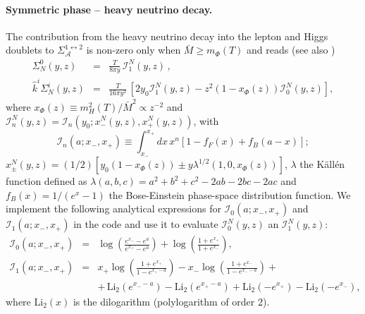 \documentclass[12pt, a4paper]{article}
\def\Mav{\bar{M}}
\begin{document}
\paragraph{Symmetric phase -- heavy neutrino decay.} The contribution from the heavy neutrino decay into the lepton and Higgs doublets to $\Sigma_\mathcal{A}^{1\leftrightarrow 2}$ is non-zero only when $\Mav \geq m_\Phi(T)$ and reads \cite{Frossard:2012pc} (see also \cite{Klaric:2021cpi})
\begin{eqnarray}
 \Sigma_N^0(y, z) &=& \frac{T}{8\pi y}\,\mathcal{I}^N_1(y, z)\,,\\
 \hat{k}^i\Sigma_N^i(y, z) &=& \frac{T}{16\pi y^2}\,\left[2y_0 \mathcal{I}^N_1(y, z) - z^2 \left(1 -x_\Phi(z)\right) \mathcal{I}^N_0(y, z)\right],
\end{eqnarray}
where $x_\Phi(z) \equiv m_H^2(T)/\Mav^2\propto z^{-2}$ and $\mathcal{I}^N_n(y, z) = \mathcal{I}_n(y_0; x^N_-(y, z), x^N_+(y,z))$, with
\begin{equation}
 \mathcal{I}_n(a; x_-, x_+) \equiv \int_{x_{-}}^{x_+} dx\, x^n [1-f_F(x)+f_B(a-x)];
\end{equation}
$x^N_{\pm}(y,z) = (1/2)[y_0(1-x_\Phi(z)) \pm y \lambda^{1/2}(1, 0, x_\Phi(z))]$, $\lambda$ the Källén function defined as $\lambda(a, b, c) = a^2 + b^2 + c^2 - 2ab - 2bc - 2ac$ and $f_B(x) = 1/(e^{x}-1)$ the Bose-Einstein phase-space distribution function.
We implement the following analytical expressions for $\mathcal{I}_0(a; x_-,x_+)$ and $\mathcal{I}_1(a; x_-,x_+)$ in the code and use it to evaluate $\mathcal{I}^N_0(y,z)$ an $\mathcal{I}^N_1(y,z)$:
\begin{eqnarray}\label{eq:mathcalI0}
 \mathcal{I}_0(a; x_-, x_+) &=& \log\left(\frac{e^{x_-}-e^{a}}{ e^{x_+}-e^{a}}\right)+ \log\left(\frac{1 + e^{x_+}}{1 + e^{x_-}}\right),\\
 \mathcal{I}_1(a; x_-, x_+) &=& x_+ \log\left(\frac{1 + e^{x_+}}{1 - e^{x_+ - a}}\right)- x_- \log\left(\frac{1 + e^{x_-}}{1 - e^{x_- -a}}\right) + \nonumber \\
 &&+\, \text{Li}_2\left(e^{x_- - a}\right) - \text{Li}_2\left(e^{x_+ - a}\right) + \text{Li}_2\left(-e^{x_+}\right) - \text{Li}_2\left(-e^{x_-}\right),\label{eq:mathcalI1}
\end{eqnarray}
where $\text{Li}_2(x)$ is the dilogarithm (polylogarithm of order 2).
\end{document}
